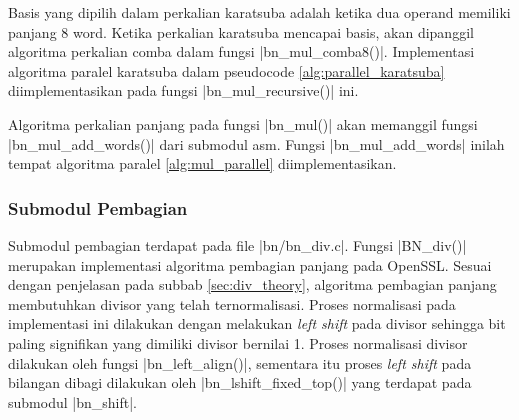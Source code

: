       Basis yang dipilih dalam perkalian karatsuba adalah ketika dua operand memiliki panjang 8 word. Ketika perkalian karatsuba mencapai basis, akan dipanggil algoritma perkalian comba dalam fungsi |bn_mul_comba8()|. Implementasi algoritma paralel karatsuba dalam pseudocode \ref{alg:parallel_karatsuba} diimplementasikan pada fungsi |bn_mul_recursive()| ini.

      Algoritma perkalian panjang pada fungsi |bn_mul()| akan memanggil fungsi |bn_mul_add_words()| dari submodul asm. Fungsi |bn_mul_add_words| inilah tempat algoritma paralel \ref{alg:mul_parallel} diimplementasikan.

    \subsubsection{Submodul Pembagian}
      Submodul pembagian terdapat pada file |bn/bn_div.c|. Fungsi |BN_div()| merupakan implementasi algoritma pembagian panjang pada OpenSSL. Sesuai dengan penjelasan pada subbab \ref{sec:div_theory}, algoritma pembagian panjang membutuhkan divisor yang telah ternormalisasi. Proses normalisasi pada implementasi ini dilakukan dengan melakukan \textit{left shift} pada divisor sehingga bit paling signifikan yang dimiliki divisor bernilai 1. Proses normalisasi divisor dilakukan oleh fungsi |bn_left_align()|, sementara itu proses \textit{left shift} pada bilangan dibagi dilakukan oleh |bn_lshift_fixed_top()| yang terdapat pada submodul |bn_shift|.

